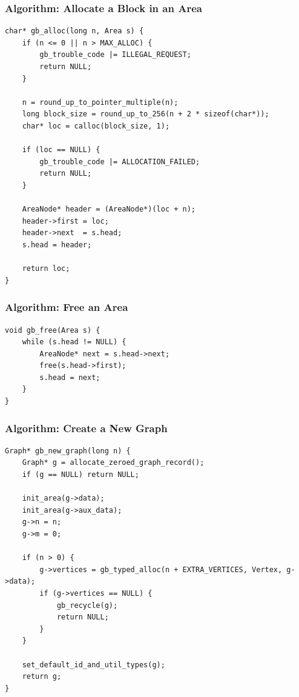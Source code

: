 \documentclass[11pt]{article}
\begin{document}
\subsubsection{Algorithm: Allocate a Block in an Area}\label{algorithm-allocate-a-block-in-an-area}

\begin{verbatim}
char* gb_alloc(long n, Area s) {
    if (n <= 0 || n > MAX_ALLOC) {
        gb_trouble_code |= ILLEGAL_REQUEST;
        return NULL;
    }

    n = round_up_to_pointer_multiple(n);
    long block_size = round_up_to_256(n + 2 * sizeof(char*));
    char* loc = calloc(block_size, 1);

    if (loc == NULL) {
        gb_trouble_code |= ALLOCATION_FAILED;
        return NULL;
    }

    AreaNode* header = (AreaNode*)(loc + n);
    header->first = loc;
    header->next  = s.head;
    s.head = header;

    return loc;
}
\end{verbatim}

\subsubsection{Algorithm: Free an Area}\label{algorithm-free-an-area}

\begin{verbatim}
void gb_free(Area s) {
    while (s.head != NULL) {
        AreaNode* next = s.head->next;
        free(s.head->first);
        s.head = next;
    }
}
\end{verbatim}

\subsubsection{Algorithm: Create a New Graph}\label{algorithm-create-a-new-graph}

\begin{verbatim}
Graph* gb_new_graph(long n) {
    Graph* g = allocate_zeroed_graph_record();
    if (g == NULL) return NULL;

    init_area(g->data);
    init_area(g->aux_data);
    g->n = n;
    g->m = 0;

    if (n > 0) {
        g->vertices = gb_typed_alloc(n + EXTRA_VERTICES, Vertex, g->data);
        if (g->vertices == NULL) {
            gb_recycle(g);
            return NULL;
        }
    }

    set_default_id_and_util_types(g);
    return g;
}
\end{verbatim}
\end{document}
